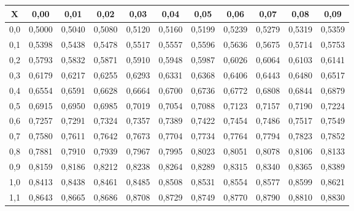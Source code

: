 \begin{tabular}{c | c c c c c c c c c c}
    X       & 0,00      & 0,01          & 0,02          & 0,03      & 0,04          & 0,05      & 0,06           & 0,07          & 0,08          & 0,09 \\
    \hline
    0,0     & 0,5000        & 0,5040        & 0,5080        & 0,5120        & 0,5160        & 0,5199& 0,5239 & 0,5279        & 0,5319        & 0,5359 \\
    0,1     & 0,5398        & 0,5438        & 0,5478        & 0,5517        & 0,5557        & 0,5596& 0,5636 & 0,5675        & 0,5714        & 0,5753 \\
    0,2     & 0,5793        & 0,5832        & 0,5871        & 0,5910        & 0,5948        & 0,5987& 0,6026 & 0,6064        & 0,6103        & 0,6141 \\
    0,3     & 0,6179        & 0,6217        & 0,6255        & 0,6293        & 0,6331        & 0,6368& 0,6406 & 0,6443        & 0,6480        & 0,6517 \\
    0,4     & 0,6554        & 0,6591        & 0,6628        & 0,6664        & 0,6700        & 0,6736& 0,6772 & 0,6808        & 0,6844        & 0,6879 \\
    0,5     & 0,6915        & 0,6950        & 0,6985        & 0,7019        & 0,7054        & 0,7088& 0,7123 & 0,7157        & 0,7190        & 0,7224 \\
    0,6     & 0,7257        & 0,7291        & 0,7324        & 0,7357        & 0,7389        & 0,7422& 0,7454 & 0,7486        & 0,7517        & 0,7549 \\
    0,7     & 0,7580        & 0,7611        & 0,7642        & 0,7673        & 0,7704        & 0,7734& 0,7764 & 0,7794        & 0,7823        & 0,7852 \\
    0,8     & 0,7881        & 0,7910        & 0,7939        & 0,7967        & 0,7995        & 0,8023& 0,8051 & 0,8078        & 0,8106        & 0,8133 \\
    0,9     & 0,8159        & 0,8186        & 0,8212        & 0,8238        & 0,8264        & 0,8289& 0,8315 & 0,8340        & 0,8365        & 0,8389 \\
    1,0     & 0,8413        & 0,8438        & 0,8461        & 0,8485        & 0,8508        & 0,8531& 0,8554 & 0,8577        & 0,8599        & 0,8621 \\
    1,1     & 0,8643        & 0,8665        & 0,8686        & 0,8708        & 0,8729        & 0,8749& 0,8770 & 0,8790        & 0,8810        & 0,8830 \\

\end{tabular}
